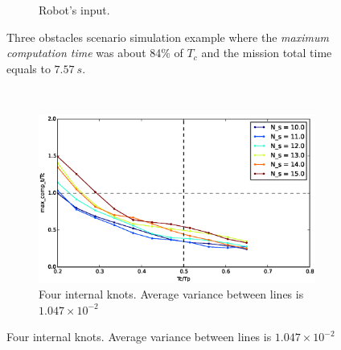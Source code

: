 \begin{figure}[!h]
\begin{subfigure}[b]{0.48\textwidth}
                \caption{Robot's input.}\label{fig:rinput}
        \end{subfigure}
        \caption{Three obstacles scenario simulation example where the \textit{maximum computation time} was about 84\% of $T_c$ and the mission total time equals to $7.57\ s$.}\label{fig:r3}
\end{figure}

\begin{figure}[!h]
        \centering
        ~ %
        \begin{subfigure}[b]{0.48\textwidth}
                \includegraphics[width=\textwidth]{./images/realtime/Scenario_3__N_knots_4/mcttc-tctp.eps}
                \caption{Four internal knots. Average variance between lines is $1.047\times 10^{-2}$}\label{fig:uni34}
        \end{subfigure}
        

\end{figure}
